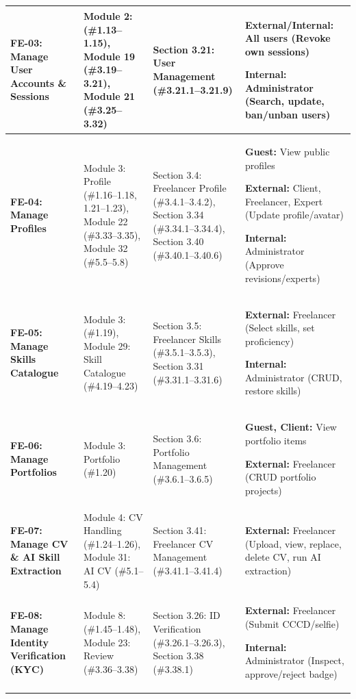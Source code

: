 \begin{longtable}{|>{\raggedright\arraybackslash}p{2.8cm}|>{\raggedright\arraybackslash}p{2.7cm}|>{\raggedright\arraybackslash}p{3.5cm}|>{\raggedright\arraybackslash}p{5.0cm}|}
\textbf{FE-03: Manage User Accounts \& Sessions} & 
Module 2: (\#1.13--1.15), Module 19 (\#3.19--3.21), Module 21 (\#3.25--3.32) & 
Section 3.21: User Management (\#3.21.1--3.21.9) & 
\textbf{External/Internal:} All users (Revoke own sessions)\par
\textbf{Internal:} Administrator (Search, update, ban/unban users) \\ \hline

\textbf{FE-04: Manage Profiles} & 
Module 3: Profile (\#1.16--1.18, 1.21--1.23), Module 22 (\#3.33--3.35), Module 32 (\#5.5--5.8) & 
Section 3.4: Freelancer Profile (\#3.4.1--3.4.2), Section 3.34 (\#3.34.1--3.34.4), Section 3.40 (\#3.40.1--3.40.6) & 
\textbf{Guest:} View public profiles\par
\textbf{External:} Client, Freelancer, Expert (Update profile/avatar)\par
\textbf{Internal:} Administrator (Approve revisions/experts) \\ \hline

\textbf{FE-05: Manage Skills Catalogue} & 
Module 3: (\#1.19), Module 29: Skill Catalogue (\#4.19--4.23) & 
Section 3.5: Freelancer Skills (\#3.5.1--3.5.3), Section 3.31 (\#3.31.1--3.31.6) & 
\textbf{External:} Freelancer (Select skills, set proficiency)\par
\textbf{Internal:} Administrator (CRUD, restore skills) \\ \hline

\textbf{FE-06: Manage Portfolios} & 
Module 3: Portfolio (\#1.20) & 
Section 3.6: Portfolio Management (\#3.6.1--3.6.5) & 
\textbf{Guest, Client:} View portfolio items\par
\textbf{External:} Freelancer (CRUD portfolio projects) \\ \hline

\textbf{FE-07: Manage CV \& AI Skill Extraction} & 
Module 4: CV Handling (\#1.24--1.26), Module 31: AI CV (\#5.1--5.4) & 
Section 3.41: Freelancer CV Management (\#3.41.1--3.41.4) & 
\textbf{External:} Freelancer (Upload, view, replace, delete CV, run AI extraction) \\ \hline

\textbf{FE-08: Manage Identity Verification (KYC)} & 
Module 8: (\#1.45--1.48), Module 23: Review (\#3.36--3.38) & 
Section 3.26: ID Verification (\#3.26.1--3.26.3), Section 3.38 (\#3.38.1) & 
\textbf{External:} Freelancer (Submit CCCD/selfie)\par
\textbf{Internal:} Administrator (Inspect, approve/reject badge) \\ \hline


\end{longtable}
